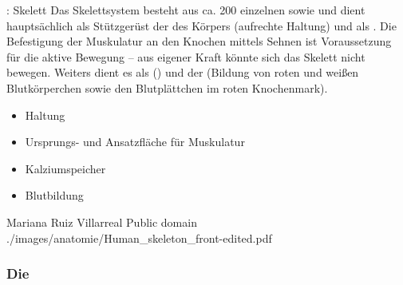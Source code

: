 \TextSlide
{{\TxBeschreibung}: Skelett}
{%
Das Skelettsystem besteht aus ca. 200 einzelnen  
sowie  
und dient hauptsächlich als
Stützgerüst der  des Körpers (aufrechte Haltung)
und als . 
%
Die Befestigung
der Muskulatur an den Knochen 
mittels Sehnen ist Voraussetzung für die aktive Bewegung 
-- aus eigener Kraft könnte sich das Skelett nicht bewegen. 
%
Weiters dient es als
 () und der 
(Bildung von roten und weißen Blutkörperchen sowie den
Blutplättchen im roten Knochenmark).
}
{
\begin{itemize}
  \item Haltung
  \item Ursprungs- und Ansatzfläche für Muskulatur
  \item Kalziumspeicher
  \item Blutbildung
\end{itemize}
}
{}{}{}

%

{}
{}
{Mariana Ruiz Villarreal}
{Public domain}
{./images/anatomie/Human_skeleton_front-edited.pdf}
{}


\subsubsection{Die }


